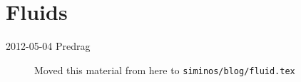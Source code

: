 
\chapter{Fluids}
\label{chap:fluids}


\begin{description}

\item[2012-05-04 Predrag] Moved this material from here to
\texttt{siminos/blog/fluid.tex}

\end{description}
